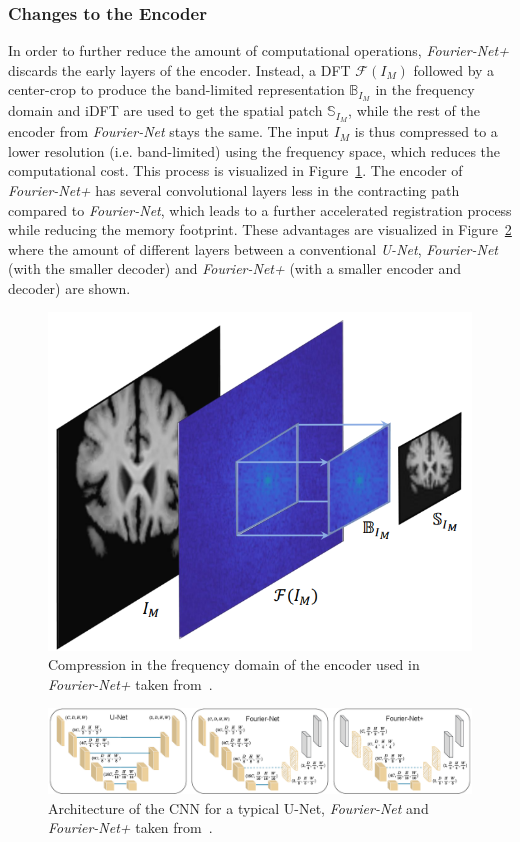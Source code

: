 \documentclass[english,version-2022-01]{uzl-thesis} %
\begin{document}
\subsubsection{Changes to the Encoder} \label{SubSubSec:ChangesEncoder}
In order to further reduce the amount of computational operations, \emph{Fourier-Net+} discards the early layers of the encoder. Instead, a DFT $\mathcal{F}(I_M)$ followed by a center-crop to produce the band-limited representation $\mathbb{B}_{I_M}$ in the frequency domain and iDFT are used to get the spatial patch $\mathbb{S}_{I_M}$, while the rest of the encoder from \emph{Fourier-Net} stays the same. The input $I_M$ is thus compressed to a lower resolution (i.e. band-limited) using the frequency space, which reduces the computational cost. This process is visualized in Figure~\ref{fig:Fourier-Net+EncoderCompression}. The encoder of \emph{Fourier-Net+} has several convolutional layers less in the contracting path compared to \emph{Fourier-Net}, which leads to a further accelerated registration process while reducing the memory footprint. These advantages are visualized in Figure~\ref{fig:Fourier-Net+CNN} where the amount of different layers between a conventional \emph{U-Net}, \emph{Fourier-Net} (with the smaller decoder) and \emph{Fourier-Net+} (with a smaller encoder and decoder) are shown.
\begin{figure}[htpb]
	\centering
	\graphicspath{{images/}{\main/images/}}
	\includegraphics[width=.5\linewidth]{CompressionEncoder.png} 
	\caption{Compression in the frequency domain of the encoder used in \emph{Fourier-Net+} taken from~\cite{Fourier-Net+}.}
	\label{fig:Fourier-Net+EncoderCompression}
\end{figure}
\begin{figure}[htpb]
	\centering
	\graphicspath{{images/}{\main/images/}}
	\includegraphics[width=\linewidth]{ArchitectureFourier-Net+CNN.png} 
	\caption{Architecture of the CNN for a typical U-Net, \emph{Fourier-Net} and \emph{Fourier-Net+} taken from~\cite{Fourier-Net+}.}
	\label{fig:Fourier-Net+CNN}
\end{figure}
\end{document}
